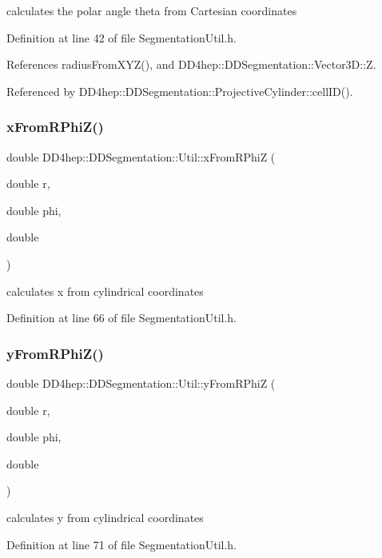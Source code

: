 calculates the polar angle theta from Cartesian coordinates 



Definition at line 42 of file Segmentation\+Util.\+h.



References radius\+From\+X\+Y\+Z(), and D\+D4hep\+::\+D\+D\+Segmentation\+::\+Vector3\+D\+::Z.



Referenced by D\+D4hep\+::\+D\+D\+Segmentation\+::\+Projective\+Cylinder\+::cell\+I\+D().

\hypertarget{namespace_d_d4hep_1_1_d_d_segmentation_1_1_util_aef69bb74835c52ef738740d16db3343e}{}\label{namespace_d_d4hep_1_1_d_d_segmentation_1_1_util_aef69bb74835c52ef738740d16db3343e} 
\subsubsection{\texorpdfstring{x\+From\+R\+Phi\+Z()}{xFromRPhiZ()}}
{\footnotesize\ttfamily double D\+D4hep\+::\+D\+D\+Segmentation\+::\+Util\+::x\+From\+R\+PhiZ (\begin{DoxyParamCaption}\item[{double}]{r,  }\item[{double}]{phi,  }\item[{double}]{ }\end{DoxyParamCaption})}



calculates x from cylindrical coordinates 



Definition at line 66 of file Segmentation\+Util.\+h.

\hypertarget{namespace_d_d4hep_1_1_d_d_segmentation_1_1_util_a7c2700f5933a62c0f9f2977adfbf6deb}{}\label{namespace_d_d4hep_1_1_d_d_segmentation_1_1_util_a7c2700f5933a62c0f9f2977adfbf6deb} 
\subsubsection{\texorpdfstring{y\+From\+R\+Phi\+Z()}{yFromRPhiZ()}}
{\footnotesize\ttfamily double D\+D4hep\+::\+D\+D\+Segmentation\+::\+Util\+::y\+From\+R\+PhiZ (\begin{DoxyParamCaption}\item[{double}]{r,  }\item[{double}]{phi,  }\item[{double}]{ }\end{DoxyParamCaption})}



calculates y from cylindrical coordinates 



Definition at line 71 of file Segmentation\+Util.\+h.

